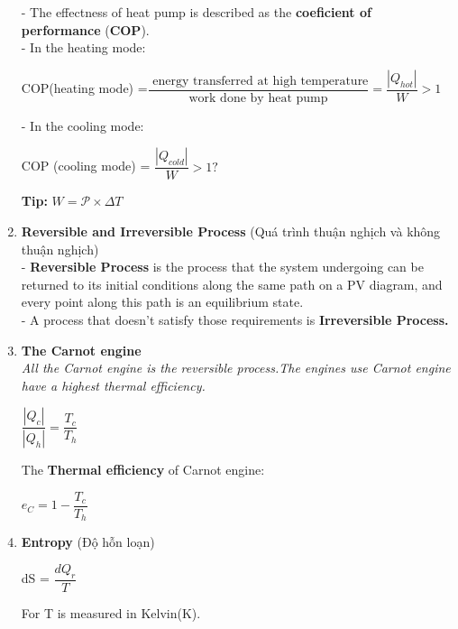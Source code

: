 \documentclass[10pt]{article}
\begin{document}
\begin{enumerate}
	- The effectness of heat pump is described as the \textbf{coeficient of performance} (\textbf{COP}).\\ 
	- In the heating mode:
	\begin{mybox}
	\begin{center}
	COP(heating mode) =$\dfrac{\mbox{ energy transferred at high temperature}}{\mbox{ work done by heat pump }} = \dfrac{|Q_{hot}|}{W} > 1 $ 
	\end{center}
	\end{mybox}
	- In the cooling mode:
	\begin{mybox}
	\begin{center}
	COP (cooling mode) = $\dfrac{|Q_{cold}|}{W} > 1?$
	\end{center}
	\end{mybox}
	\textbf{Tip:} $W = \mathscr{P} \times \Delta T$
	\item \textbf{Reversible and Irreversible Process} (Quá trình thuận nghịch và không thuận nghịch)\\
	 - \textbf{Reversible Process} is the process that the system undergoing can be returned to its initial conditions along the same path on a PV diagram, and every point along this path is an equilibrium state.\\
	 - A process that doesn't satisfy those requirements  is \textbf{Irreversible Process.}
	 \item \textbf{The Carnot engine}\\
	 \textit{All the Carnot engine is the reversible process.The engines use Carnot engine have a highest thermal efficiency.}
	 \begin{mybox}
	 \begin{center}
	 $\dfrac{|Q_c|}{|Q_h|} = \dfrac{T_c}{T_h}$
	 \end{center}
	 \end{mybox}
	 The \textbf{Thermal efficiency} of Carnot engine:
	 \begin{mybox}
	 \begin{center}
	 $e_C = 1 - \dfrac{T_c}{T_h}$
	 \end{center}
	 \end{mybox}
	 \item \textbf{Entropy} (Độ hỗn loạn)
	 \begin{mybox}
	 \begin{center}
	 dS = $\dfrac{dQ_r}{T}$
	 \end{center}
	 \end{mybox}
	 For T is measured in Kelvin(K).\\

\end{enumerate}
\end{document}
